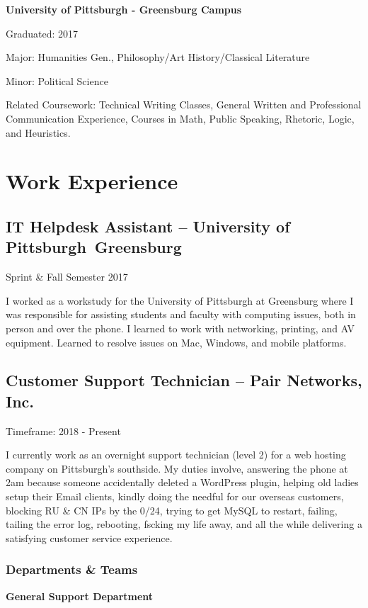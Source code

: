 \documentclass{article}
\begin{document}
\textbf{University of Pittsburgh - Greensburg Campus}

Graduated: 2017

Major: Humanities Gen., Philosophy/Art History/Classical Literature

Minor: Political Science

Related Coursework: Technical Writing Classes, General Written and Professional
Communication Experience, Courses in Math, Public Speaking, Rhetoric, Logic,
and Heuristics.

\section{Work Experience}

\subsection{IT Helpdesk Assistant -- University of Pittsburgh Greensburg}
Sprint \& Fall Semester 2017

I worked as a workstudy for the University of Pittsburgh at Greensburg where I
was responsible for assisting students and faculty with computing issues, both
in person and over the phone. I learned to work with networking, printing, and
AV equipment. Learned to resolve issues on Mac, Windows, and mobile platforms.

\subsection{Customer Support Technician -- Pair Networks, Inc.}

Timeframe: 2018 - Present

I currently work as an overnight support technician (level 2) for a web hosting
company on Pittsburgh's southside. My duties involve, answering the phone at
2am because someone accidentally deleted a WordPress plugin, helping old ladies
setup their Email clients, kindly doing the needful for our overseas customers,
blocking RU \& CN IPs by the 0/24, trying to get MySQL to restart, failing,
tailing the error log, rebooting, fscking my life away, and all the while
delivering a satisfying customer service experience.

\subsubsection{Departments \& Teams}

\textbf{General Support Department}
\end{document}
